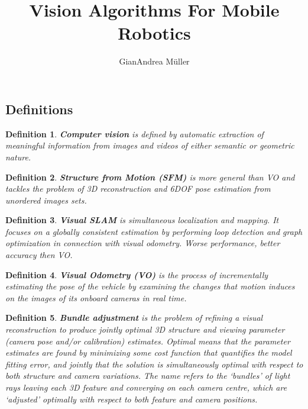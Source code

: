 \documentclass[10pt,a4paper]{scrartcl}
\title{Vision Algorithms For Mobile Robotics}
\author{GianAndrea Müller}
\newtheorem{define}{Definition}
\begin{document}
\begin{multicols*}{4}
\maketitle
\tableofcontents
\end{multicols*}

\begin{multicols*}{2}

\section{Definitions}

\begin{define}
\textbf{Computer vision} is defined by automatic extraction of meaningful information from images and videos of either semantic or geometric nature.
\end{define}

\begin{define}
\textbf{Structure from Motion (SFM)} is more general than VO and tackles the problem of 3D reconstruction and 6DOF pose estimation from unordered images sets.
\end{define}

\begin{define}
\textbf{Visual SLAM} is simultaneous localization and mapping. It focuses on a globally consistent estimation by performing loop detection and graph optimization in connection with visual odometry. Worse performance, better accuracy then VO.
\end{define}

\begin{define}
\textbf{Visual Odometry (VO)} is the process of incrementally estimating the pose of the vehicle by examining the changes that motion induces on the images of its onboard cameras in real time.
\end{define}

\begin{define}
\textbf{Bundle adjustment} is the problem of refining a visual reconstruction to produce jointly optimal
3D structure and viewing parameter (camera pose and/or calibration) estimates. Optimal means that the parameter estimates are found by minimizing some cost function that quantifies the model fitting
error, and jointly that the solution is simultaneously optimal with respect to both structure and camera
variations. The name refers to the ‘bundles’ of light rays leaving each 3D feature and converging on
each camera centre, which are ‘adjusted’ optimally with respect to both feature and camera positions.
\end{define}


\end{multicols*}
\end{document}
